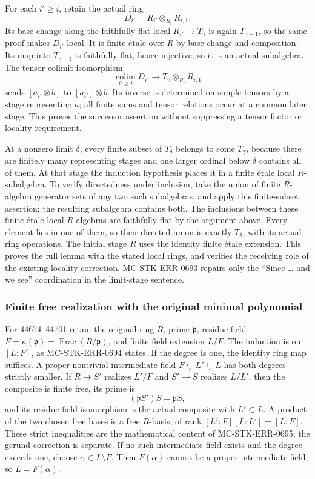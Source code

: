 For each \(i'\geq i\), retain the actual ring \[
 D_{i'}=R_{i'}\otimes_{R_i}R_{i,1}.
\] Its base change along the faithfully flat local \(R_{i'}\to T_\gamma\) is again \(T_{\gamma+1}\), so the same proof makes \(D_{i'}\) local. It is finite étale over \(R\) by base change and composition. Its map into \(T_{\gamma+1}\) is faithfully flat, hence injective, so it is an actual subalgebra. The tensor-colimit isomorphism \[
 \operatorname*{colim}_{i'\geq i}D_{i'}
      \longrightarrow T_\gamma\otimes_{R_i}R_{i,1}
\] sends \([a_{i'}\otimes b]\) to \([a_{i'}]\otimes b\). Its inverse is determined on simple tensors by a stage representing \(a\); all finite sums and tensor relations occur at a common later stage. This proves the successor assertion without suppressing a tensor factor or locality requirement.

At a nonzero limit \(\delta\), every finite subset of \(T_\delta\) belongs to some \(T_\gamma\), because there are finitely many representing stages and one larger ordinal below \(\delta\) contains all of them. At that stage the induction hypothesis places it in a finite étale local \(R\)-subalgebra. To verify directedness under inclusion, take the union of finite \(R\)-algebra generator sets of any two such subalgebras, and apply this finite-subset assertion; the resulting subalgebra contains both. The inclusions between these finite étale local \(R\)-algebras are faithfully flat by the argument above. Every element lies in one of them, so their directed union is exactly \(T_\delta\), with its actual ring operations. The initial stage \(R\) uses the identity finite étale extension. This proves the full lemma with the stated local rings, and verifies the receiving role of the existing locality correction. MC-STK-ERR-0693 repairs only the ``Since \ldots{} and we see'' coordination in the limit-stage sentence.

\subsubsection{Finite free realization with the original minimal polynomial}\label{finite-free-realization-with-the-original-minimal-polynomial}

For 44674--44701 retain the original ring \(R\), prime \(\mathfrak p\), residue field \(F=\kappa(\mathfrak p)=\operatorname{Frac}(R/\mathfrak p)\), and finite field extension \(L/F\). The induction is on \([L:F]\), as MC-STK-ERR-0694 states. If the degree is one, the identity ring map suffices. A proper nontrivial intermediate field \(F\subsetneq L'\subsetneq L\) has both degrees strictly smaller. If \(R\to S'\) realizes \(L'/F\) and \(S'\to S\) realizes \(L/L'\), then the composite is finite free, its prime is \[
 (\mathfrak pS')S=\mathfrak pS,
\] and its residue-field isomorphism is the actual composite with \(L'\subset L\). A product of the two chosen free bases is a free \(R\)-basis, of rank \([L':F][L:L']=[L:F]\). These strict inequalities are the mathematical content of MC-STK-ERR-0695; the gerund correction is separate. If no such intermediate field exists and the degree exceeds one, choose \(\alpha\in L\setminus F\). Then \(F(\alpha)\) cannot be a proper intermediate field, so \(L=F(\alpha)\).

